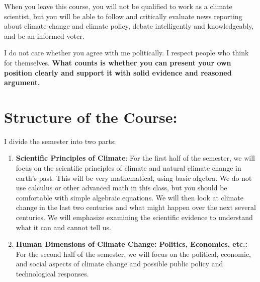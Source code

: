 \documentclass[11pt,twoside]{jgsyllabus}\usepackage[]{graphicx}\usepackage[]{color}
\begin{document}
When you leave this course, you will not be qualified to work as a climate scientist, but
you will be able to follow and critically evaluate news
reporting about climate change and climate policy, debate intelligently and knowledgeably,
and be an informed voter.

I do not care whether you agree with me politically.
I respect people who think for themselves.
\textbf{What counts is whether you can present your own position clearly
and support it with solid evidence and reasoned argument.}
%
%
%
\iffalse
\section{Important Dates:}
Many of you have athletic and other commitments during the term and may travel for
personal reasons. As you plan for your semester, particularly if you are purchasing
nonrefundable airplane tickets, consult the syllabus.

If you have away games that require you to miss a scheduled test or group laboratory activity, let me know well in advance.
\begin{itemize}
%
\item The mid-term test is on
\textbf{NA}.
\item On
\textbf{., . }
we will be playing a game in lab to simulate the challenge of converting
New York City to using clean energy and on
\textbf{Mon., Apr. 12}
we will be doing a participatory role-playing
exercise in lab, where you will play out different kinds of policies
for reducing greenhouse gas emissions. It is especially important for you to be
present for these labs.
\item The final exam will be in a take-home essay format and it is due at
\textbf{\TakeHomeExamEndTime~\TakeHomeExamDay, \TakeHomeExamMonth~\TakeHomeExamDate}%
. You submit the final exam electronically, so you do not need to be on campus
for this.
\end{itemize}
\fi
%
%
%
%
%
\clearpage
\section[Structure]{Structure of the Course:}
I divide the semester into two parts:
\begin{enumerate}
    \item \textbf{Scientific Principles of Climate}: For the first half of the
    semester, we will focus on the scientific principles of climate and natural
    climate change in earth's past. This will be very mathematical, using basic
    algebra. We do not use calculus or other advanced math in this class, but
    you should be comfortable with simple algebraic equations.
    We will then look at climate change in the last two centuries and what might
    happen over the next several centuries. We will emphasize examining the
    scientific evidence to understand what it can and cannot tell us.
    \item \textbf{Human Dimensions of Climate Change: Politics, Economics, etc.:}
    For the second half of the semester, we will focus on the political,
    economic, and social aspects of climate change and possible public policy
    and technological responses.
\end{enumerate}
%
%
%
\end{document}
